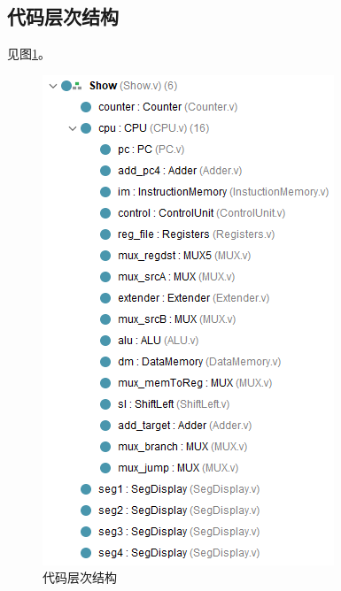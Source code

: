 \subsection{代码层次结构}
\qquad 见图\ref{fig:code_hierachy}。
\begin{figure}[H]
\centering
\includegraphics[width=0.4\linewidth]{fig/code_hierachy.PNG}
\caption{代码层次结构}
\label{fig:code_hierachy}
\end{figure}